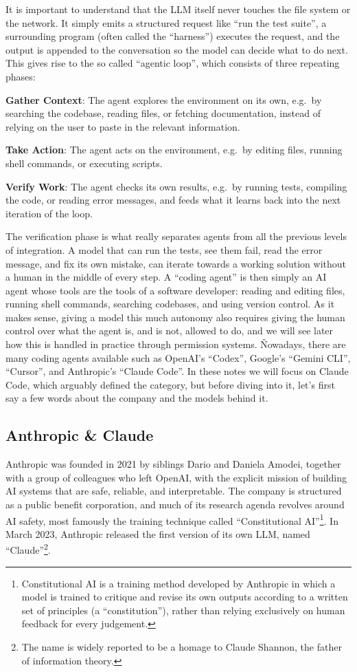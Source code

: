 It is important to understand that the LLM itself never touches the file system or the network. It simply emits a
structured request like ``run the test suite'', a surrounding program (often called the ``harness'') executes the
request, and the output is appended to the conversation so the model can decide what to do next. This gives rise to
the so called ``agentic loop'', which consists of three repeating phases:
\bit
\item \textbf{Gather Context}: The agent explores the environment on its own, e.g.\ by searching the codebase, reading
files, or fetching documentation, instead of relying on the user to paste in the relevant information.
\item \textbf{Take Action}: The agent acts on the environment, e.g.\ by editing files, running shell commands, or
executing scripts.
\item \textbf{Verify Work}: The agent checks its own results, e.g.\ by running tests, compiling the code, or reading
error messages, and feeds what it learns back into the next iteration of the loop.
\eit

The verification phase is what really separates agents from all the previous levels of integration. A model that can
run the tests, see them fail, read the error message, and fix its own mistake, can iterate towards a working solution
without a human in the middle of every step. A ``coding agent'' is then simply an AI agent whose tools are the tools
of a software developer: reading and editing files, running shell commands, searching codebases, and using version
control. As it makes sense, giving a model this much autonomy also requires giving the human control over what the
agent is, and is not, allowed to do, and we will see later how this is handled in practice through permission systems. \v

Nowadays, there are many coding agents available such as OpenAI's ``Codex'', Google's ``Gemini CLI'', ``Cursor'', and
Anthropic's ``Claude Code''. In these notes we will focus on Claude Code, which arguably defined the category, but
before diving into it, let's first say a few words about the company and the models behind it.

\subsection{Anthropic \& Claude}

Anthropic was founded in 2021 by siblings Dario and Daniela Amodei, together with a group of colleagues who left
OpenAI, with the explicit mission of building AI systems that are safe, reliable, and interpretable. The company is
structured as a public benefit corporation, and much of its research agenda revolves around AI safety, most famously
the training technique called ``Constitutional AI''\footnote{Constitutional AI is a training method developed by
Anthropic in which a model is trained to critique and revise its own outputs according to a written set of principles
(a ``constitution''), rather than relying exclusively on human feedback for every judgement.}. In March 2023,
Anthropic released the first version of its own LLM, named ``Claude''\footnote{The name is widely reported to be a
homage to Claude Shannon, the father of information theory.}.

